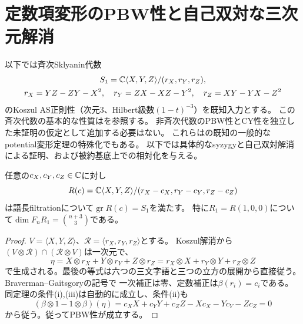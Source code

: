 \section{定数項変形のPBW性と自己双対な三次元解消}
\label{sec:quotient-pbw-cy}
以下では斉次Sklyanin代数
\[
 \begin{gathered}
 S_1=\mathbb C\langle X,Y,Z\rangle/(r_X,r_Y,r_Z),\\
 r_X=YZ-ZY-X^2,\quad r_Y=ZX-XZ-Y^2,\quad r_Z=XY-YX-Z^2
 \end{gathered}
\]
のKoszul AS正則性（次元3、Hilbert級数$(1-t)^{-3}$）を既知入力とする。
この斉次代数の基本的な性質は\cite[Proposition~2.21, \S8.2]{WWYSklyanin}を参照する。
非斉次代数のPBW性とCY性を独立した未証明の仮定として追加する必要はない。
これらは\cite[Theorem~3.3.2]{EGDelPezzo}の既知の一般的なpotential変形定理の特殊化でもある。
以下では具体的なsyzygyと自己双対解消による証明、および被約基底上での相対化を与える。

\begin{proposition}[任意の定数項変形のPBW性]
\label{prop:quotient-constant-pbw}
任意の$c_X,c_Y,c_Z\in\mathbb C$に対し
\[
 R(c)=\mathbb C\langle X,Y,Z\rangle/
 (r_X-c_X,r_Y-c_Y,r_Z-c_Z)
\]
は語長filtrationについて$\operatorname{gr}R(c)=S_1$を満たす。
特に$R_1=R(1,0,0)$について$\dim F_nR_1=\binom{n+3}{3}$である。
\end{proposition}
\begin{proof}
$V=\langle X,Y,Z\rangle$、$\mathcal R=\langle r_X,r_Y,r_Z\rangle$とする。
Koszul解消から$(V\otimes\mathcal R)\cap(\mathcal R\otimes V)$は一次元で、
\[
 \eta=X\otimes r_X+Y\otimes r_Y+Z\otimes r_Z
     =r_X\otimes X+r_Y\otimes Y+r_Z\otimes Z
\]
で生成される。最後の等式は六つの三文字語と三つの立方の展開から直接従う。
Braverman--Gaitsgory\cite[Main Theorem~0.5, Lemma~3.3]{BGPBW}の記号で
一次補正は零、定数補正は$\beta(r_i)=c_i$である。
同定理の条件(i),(iii)は自動的に成立し、条件(ii)も
\[
 (\beta\otimes1-1\otimes\beta)(\eta)
 =c_XX+c_YY+c_ZZ-Xc_X-Yc_Y-Zc_Z=0
\]
から従う。従ってPBW性が成立する。
\end{proof}

